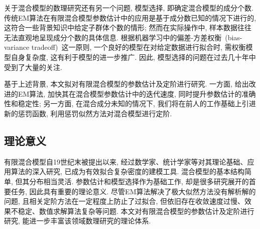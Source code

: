 \documentclass[a4paper,12pt,openany,oneside,utf-8]{ctexbook}
\begin{document}
关于混合模型的数理研究还有另一个问题, 模型选择, 即确定混合模型的成分个数. 传统EM算法在有限混合模型参数估计中的应用是基于成分数已知的情况下进行的, 这符合一些背景知识中给定子群体个数的情形; 然而在实际操作中, 样本数据往往无法直观地呈现成分个数的具体信息. 根据机器学习中的偏差-方差权衡~(bias-variance tradeoff)~这一原则, 一个良好的模型在对给定数据进行拟合时, 需权衡模型自身复杂度, 这有利于模型的进一步推广. 因此, 模型选择的问题在过去几十年中受到了大量的关注.


基于上述背景, 本文拟对有限混合模型的参数估计及定阶进行研究. 一方面, 给出改进的EM算法, 加快其在混合模型参数估计中的迭代速度, 同时提升参数估计的准确性和稳定性; 另一方面, 在混合成分未知的情况下, 我们将在前人的工作基础上引进新的惩罚函数, 利用惩罚似然方法对混合模型进行定阶. 

\subsection{理论意义}
有限混合模型自19世纪末被提出以来, 经过数学家、统计学家等对其理论基础、应用算法的深入研究, 已成为有效拟合复杂密度的建模工具. 混合模型的基本结构简单, 但其分布相当灵活. 参数估计和模型选择作为基础工作, 却是很多研究展开的首要任务, 因此具有重要的理论意义. 尽管EM算法解决了极大似然方法没有解析解的问题, 且相关定阶方法在一定程度上防止了过拟合, 但依旧存在收敛速度过慢、效果不稳定、数值求解算法复杂等问题. 本文对有限混合模型的参数估计及定阶进行研究, 能进一步丰富该领域数理研究的理论体系.%
\end{document}
